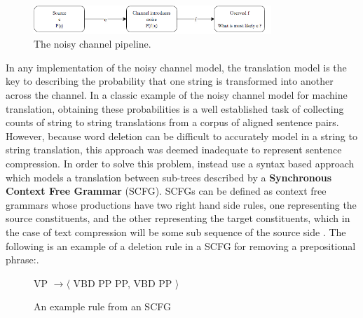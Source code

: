 \begin{figure}[H]
\centering
\includegraphics[width=0.8\textwidth]{noisyCh.png}
\caption{The noisy channel pipeline.}
\label{fig:channel}
\end{figure}


{In any implementation of the noisy channel model, the translation model is the key to describing the probability that one string is transformed into another across the channel.  In a classic example of the noisy channel model for machine translation, obtaining these probabilities is a well established task of collecting counts of string to string translations from a corpus of aligned sentence pairs.  However, because word deletion can be difficult to accurately model in a string to string translation, this approach was deemed inadequate to represent sentence compression.  In order to solve this problem, \citet{knight2000statistics} instead use a syntax based approach which models a translation between sub-trees described by a \textbf{Synchronous Context Free Grammar} (SCFG).  SCFGs can be defined as context free grammars whose productions have two right hand side rules, one representing the source constituents, and the other representing the target constituents, which in the case of text compression will be some sub sequence of the source side \citep{galley2007lexicalized}. The following is an example of a deletion rule in a SCFG for removing a prepositional phrase:.}

\begin{figure}[H]
\centering
VP $ \rightarrow  \langle$ VBD PP PP, VBD PP $\rangle$
\caption{An example rule from an SCFG}
\label{fig:scfg}
\end{figure}

